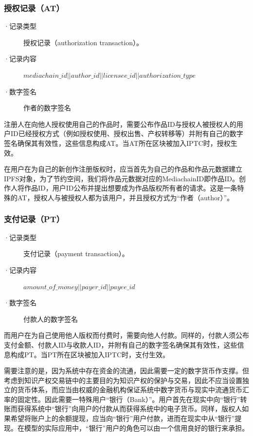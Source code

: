 \documentclass[withoutpreface,bwprint]{cumcmthesis} %
\begin{document}
\subsubsection{授权记录（AT）}
\begin{description}
	\item[·记录类型] 授权记录（authorization transaction）。
	\item[·记录内容] $mediachain\_id || author\_id || licensee\_id || authorization\_type$
	\item[·数字签名] 作者的数字签名
\end{description}

注册人在向他人授权使用自己的作品时，需要公布作品ID与授权人被授权人的用户ID已经授权方式（例如授权使用、授权出售、产权转移等）并附有自己的数字签名确保其有效性，这些信息构成AT。当AT所在区块被加入IPTC时，授权生效。

在用户在为自己的新创作注册版权时，应当首先为自己的作品和作品元数据建立IPFS对象，为了节约空间，我们将作品元数据对应的MediachainID即作品ID。创作人将作品ID，用户ID公布并提出想要成为作品版权所有者的请求。这是一条特殊的AT，授权人与被授权人都为该用户，并且授权方式为“作者（author）”。

\subsubsection{支付记录（PT）}
\begin{description}
	\item[·记录类型] 支付记录（payment transaction）。
	\item[·记录内容] $amount\_of
	\_money || payer\_id || payee\_id$ 
	\item[·数字签名] 付款人的数字签名
\end{description}

而用户在为自己使用他人版权而付费时，需要向他人付款。同样的，付款人须公布支付金额、付款人ID与收款人ID，并附有自己的数字签名确保其有效性，这些信息构成PT。当PT所在区块被加入IPTC时，支付生效。

需要注意的是，因为系统中存在资金的流通，因此需要一定的数字货币作支撑。但考虑到知识产权交易链中的主要目的为知识产权的保护与交易，因此不应当设置独立的货币体系，而应当由权威的金融机构保证系统中数字货币与现实中流通货币汇率的固定性。因此需要一特殊用户“银行（Bank）”。用户首先在现实中向“银行”转账而获得系统中“银行”向用户的付款从而获得系统中的电子货币。同样，版权人如果希望将账户上的余额提现，应当向“银行”用户付款，进而在现实中从“银行”提现。在模型的实际应用中，“银行”用户的角色可以由一个信用良好的银行来承担。
\end{document}
